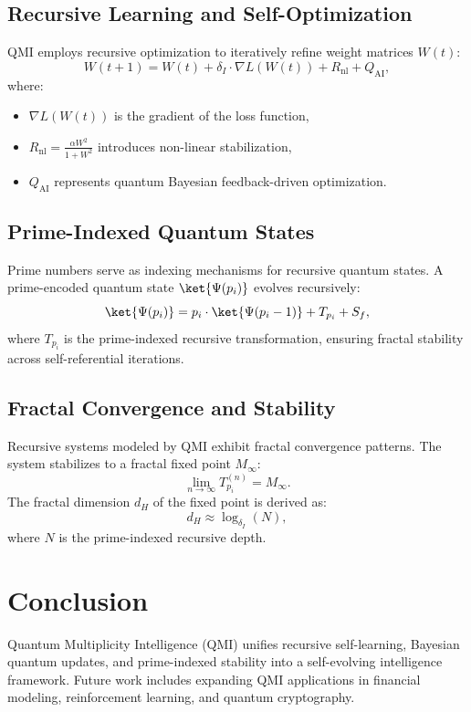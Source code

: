\documentclass{article}
\theoremstyle{plain}
\begin{document}
\begin{itemize}
\subsection{Recursive Learning and Self-Optimization}
QMI employs recursive optimization to iteratively refine weight matrices $W(t)$:
\begin{equation}
    W(t+1) = W(t) + \delta_I \cdot \nabla L(W(t)) + R_{\text{nl}} + Q_{\text{AI}},
\end{equation}
where:
\begin{itemize}
    \item $\nabla L(W(t))$ is the gradient of the loss function,
    \item $R_{\text{nl}} = \frac{\alpha W^2}{1 + W^2}$ introduces non-linear stabilization,
    \item $Q_{\text{AI}}$ represents quantum Bayesian feedback-driven optimization.
\end{itemize}

\subsection{Prime-Indexed Quantum States}
Prime numbers serve as indexing mechanisms for recursive quantum states. A prime-encoded quantum state $\ket{\Psi(p_i)}$ evolves recursively:
\begin{equation}
    \ket{\Psi(p_i)} = p_i \cdot \ket{\Psi(p_i - 1)} + T_{p_i} + S_f,
\end{equation}
where $T_{p_i}$ is the prime-indexed recursive transformation, ensuring fractal stability across self-referential iterations.

\subsection{Fractal Convergence and Stability}
Recursive systems modeled by QMI exhibit fractal convergence patterns. The system stabilizes to a fractal fixed point $M_\infty$:
\begin{equation}
    \lim_{n \to \infty} T_{p_i}^{(n)} = M_\infty.
\end{equation}
The fractal dimension $d_H$ of the fixed point is derived as:
\begin{equation}
    d_H \approx \log_{\delta_I} (N),
\end{equation}
where $N$ is the prime-indexed recursive depth.

\section{Conclusion}
Quantum Multiplicity Intelligence (QMI) unifies recursive self-learning, Bayesian quantum updates, and prime-indexed stability into a self-evolving intelligence framework. Future work includes expanding QMI applications in financial modeling, reinforcement learning, and quantum cryptography.


\end{itemize}
\end{document}
